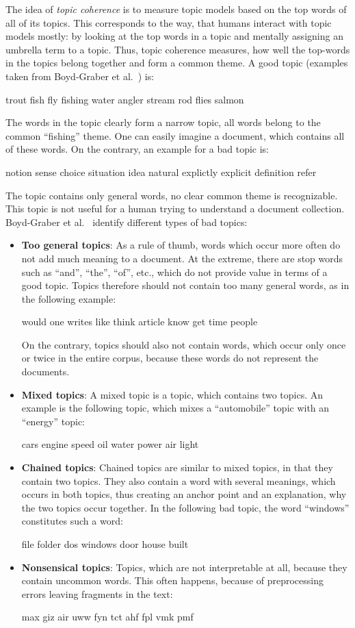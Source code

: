 \documentclass[
        a4paper,
        titlepage,
        twoside,
        parskip
        ]{scrbook}
\newcommand{\topicbox}[1]{
  \setlength{\OuterFrameSep}{0pt}
  \begin{framed}
    #1
  \end{framed}
}
\newcommand{\topicboxList}[1]{
  \setlength{\OuterFrameSep}{0pt}
  \newline
  \begin{minipage}{\linewidth}
    \vspace{6pt}
    \begin{framed}
      #1
    \end{framed}
    \vspace{6pt}
  \end{minipage}
}
\theoremstyle{break}
\begin{document}
The idea of \emph{topic coherence} is to measure topic models based on the top words of all of its topics.
This corresponds to the way, that humans interact with topic models mostly: by looking at the top words in a topic and mentally assigning an umbrella term to a topic.
Thus, topic coherence measures, how well the top-words in the topics belong together and form a common theme.
A good topic (examples taken from Boyd-Graber et al.~\cite{Boyd-graber2014}) is: \topicbox{trout fish fly fishing water angler stream rod flies salmon}
The words in the topic clearly form a narrow topic, all words belong to the common ``fishing'' theme.
One can easily imagine a document, which contains all of these words.
On the contrary, an example for a bad topic is:
\topicbox{notion sense choice situation idea natural explictly explicit definition refer}
The topic contains only general words, no clear common theme is recognizable.
This topic is not useful for a human trying to understand a document collection.
Boyd-Graber et al.~\cite{Boyd-graber2014} identify different types of bad topics:
\begin{itemize}
  \item
    \textbf{Too general topics}: As a rule of thumb, words which occur more often do not add much meaning to a document.
    At the extreme, there are stop words such as ``and'', ``the'', ``of'', etc., which do not provide value in terms of a good topic.
    Topics therefore should not contain too many general words, as in the following example:
    \topicboxList{would one writes like think article know get time people}
    On the contrary, topics should also not contain words, which occur only once or twice in the entire corpus, because these words do not represent the documents.
  \item
    \textbf{Mixed topics}: A mixed topic is a topic, which contains two topics.
    An example is the following topic, which mixes a ``automobile'' topic with an ``energy'' topic:
    \topicboxList{cars engine speed oil water power air light}
  \item
    \textbf{Chained topics}: Chained topics are similar to mixed topics, in that they contain two topics.
    They also contain a word with several meanings, which occurs in both topics, thus creating an anchor point and an explanation, why the two topics occur together.
    In the following bad topic, the word ``windows'' constitutes such a word:
    \topicboxList{file folder dos windows door house built}
  \item
    \textbf{Nonsensical topics}:
    Topics, which are not interpretable at all, because they contain uncommon words.
    This often happens, because of preprocessing errors leaving fragments in the text:
    \topicboxList{max giz air uww fyn tct ahf fpl vmk pmf}
\end{itemize}
\end{document}
